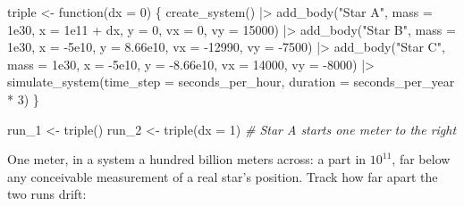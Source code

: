 \documentclass[
  10.5pt,
  letterpaper,
]{scrbook}
\newenvironment{Shaded}{\begin{snugshade}}{\end{snugshade}}
\newcommand{\AttributeTok}[1]{\textcolor[rgb]{0.00,0.00,0.00}{#1}}
\newcommand{\CommentTok}[1]{\textcolor[rgb]{0.00,0.00,0.00}{\textit{#1}}}
\newcommand{\ControlFlowTok}[1]{\textcolor[rgb]{0.00,0.00,0.00}{#1}}
\newcommand{\DecValTok}[1]{\textcolor[rgb]{0.00,0.00,0.00}{#1}}
\newcommand{\FloatTok}[1]{\textcolor[rgb]{0.00,0.00,0.00}{#1}}
\newcommand{\FunctionTok}[1]{\textcolor[rgb]{0.00,0.00,0.00}{#1}}
\newcommand{\NormalTok}[1]{\textcolor[rgb]{0.00,0.00,0.00}{#1}}
\newcommand{\OtherTok}[1]{\textcolor[rgb]{0.00,0.00,0.00}{#1}}
\newcommand{\SpecialCharTok}[1]{\textcolor[rgb]{0.00,0.00,0.00}{#1}}
\newcommand{\StringTok}[1]{\textcolor[rgb]{0.00,0.00,0.00}{#1}}
\theoremstyle{definition}
\theoremstyle{plain}
\theoremstyle{remark}
\begin{document}
\begin{Shaded}
\begin{Highlighting}[]
\NormalTok{triple }\OtherTok{\textless{}{-}} \ControlFlowTok{function}\NormalTok{(}\AttributeTok{dx =} \DecValTok{0}\NormalTok{) \{}
  \FunctionTok{create\_system}\NormalTok{() }\SpecialCharTok{|\textgreater{}}
    \FunctionTok{add\_body}\NormalTok{(}\StringTok{"Star A"}\NormalTok{, }\AttributeTok{mass =} \FloatTok{1e30}\NormalTok{, }\AttributeTok{x =} \FloatTok{1e11} \SpecialCharTok{+}\NormalTok{ dx, }\AttributeTok{y =} \DecValTok{0}\NormalTok{,}
             \AttributeTok{vx =} \DecValTok{0}\NormalTok{, }\AttributeTok{vy =} \DecValTok{15000}\NormalTok{) }\SpecialCharTok{|\textgreater{}}
    \FunctionTok{add\_body}\NormalTok{(}\StringTok{"Star B"}\NormalTok{, }\AttributeTok{mass =} \FloatTok{1e30}\NormalTok{, }\AttributeTok{x =} \SpecialCharTok{{-}}\FloatTok{5e10}\NormalTok{, }\AttributeTok{y =} \FloatTok{8.66e10}\NormalTok{,}
             \AttributeTok{vx =} \SpecialCharTok{{-}}\DecValTok{12990}\NormalTok{, }\AttributeTok{vy =} \SpecialCharTok{{-}}\DecValTok{7500}\NormalTok{) }\SpecialCharTok{|\textgreater{}}
    \FunctionTok{add\_body}\NormalTok{(}\StringTok{"Star C"}\NormalTok{, }\AttributeTok{mass =} \FloatTok{1e30}\NormalTok{, }\AttributeTok{x =} \SpecialCharTok{{-}}\FloatTok{5e10}\NormalTok{, }\AttributeTok{y =} \SpecialCharTok{{-}}\FloatTok{8.66e10}\NormalTok{,}
             \AttributeTok{vx =} \DecValTok{14000}\NormalTok{, }\AttributeTok{vy =} \SpecialCharTok{{-}}\DecValTok{8000}\NormalTok{) }\SpecialCharTok{|\textgreater{}}
    \FunctionTok{simulate\_system}\NormalTok{(}\AttributeTok{time\_step =}\NormalTok{ seconds\_per\_hour, }\AttributeTok{duration =}\NormalTok{ seconds\_per\_year }\SpecialCharTok{*} \DecValTok{3}\NormalTok{)}
\NormalTok{\}}

\NormalTok{run\_1 }\OtherTok{\textless{}{-}} \FunctionTok{triple}\NormalTok{()}
\NormalTok{run\_2 }\OtherTok{\textless{}{-}} \FunctionTok{triple}\NormalTok{(}\AttributeTok{dx =} \DecValTok{1}\NormalTok{)      }\CommentTok{\# Star A starts one meter to the right}
\end{Highlighting}
\end{Shaded}

One meter, in a system a hundred billion meters across: a part in
\(10^{11}\), far below any conceivable measurement of a real star's
position. Track how far apart the two runs drift:
\end{document}
